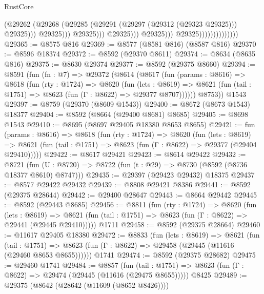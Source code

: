 \begin{lexlean}{RustCore}
\begin{coremodule}
                                                      (@29262
                                                        (@29268
                                                          (@29285
                                                            (@29291
                                                              (@29297 (@29312 (@29323 @29325)))
                                                              @29325)))
                                                        @29325)))
                                                  @29325)))
                                            @29325)))
                                      @29325)))
                                @29325))))))))))))))
@29365 := @8575 @816
@29369 := @8577 (@8581 @816) (@8587 @816)
@29370 := @8596 @18374
@29372 := @8592 (@29370 @8611)
@29374 := @8634 (@8635 @816)
@29375 := @8630 @29374
@29377 := @8592 (@29375 @8660)
@29394 := @8591
    (fun (fn : @7) =>
    @29372
      (@8614
        (@8617
          (fun (params : @8616) =>
          @8618
            (fun (rty : @1724) =>
            @8620
              (fun (lets : @8619) =>
              @8621 (fun (tail : @1751) => @8623 (fun (Γ : @8622) => @29377 @8707))))))
        @8753))
    @1543
@29397 := @8759 (@29370 (@8609 @1543))
@29400 := @8672 (@8673 @1543) @18377
@29404 := @8592 (@8664 (@29400 @8681) @8685)
@29405 := @8698 @1543
@29410 := @8695 (@8697 @29405 @18380 @8653 @8655)
@29421 := fun (params : @8616) =>
  @8618
    (fun (rty : @1724) =>
    @8620
      (fun (lets : @8619) =>
      @8621 (fun (tail : @1751) => @8623 (fun (Γ : @8622) => @29377 (@29404 @29410)))))
@29422 := @8617 @29421
@29423 := @8614 @29422
@29432 := @8721
    (fun (U : @8720) => @8722 (fun (t : @29) => @8730 (@8592 (@8736 @18377 @8610) @8747)))
@29435 := @29397 (@29423 @29432) @18375
@29437 := @8577 @29422 @29432
@29439 := @8808 @29421 @8386
@29441 := @8592 (@29375 @28644)
@29442 := @29400 @28647
@29443 := @8664 @29442
@29445 := @8592 (@29443 @8685)
@29456 := @8811
    (fun (rty : @1724) =>
    @8620
      (fun (lets : @8619) =>
      @8621 (fun (tail : @1751) => @8623 (fun (Γ : @8622) => @29441 (@29445 @29410)))))
    @1711
@29458 := @8592 (@29375 @28664)
@29460 := @11617 @29405 @18380
@29472 := @8833
    (fun (lets : @8619) =>
    @8621
      (fun (tail : @1751) =>
      @8623 (fun (Γ : @8622) => @29458 (@29445 (@11616 (@29460 @8653 @8655))))))
    @1741
@29474 := @8592 (@29375 @28682)
@29475 := @29460 @1741
@29484 := @8857
    (fun (tail : @1751) => @8623 (fun (Γ : @8622) => @29474 (@29445 (@11616 (@29475 @8655)))))
    @8425
@29489 := @29375 (@8642 (@28642 (@11609 (@8652 @8426))))

\end{coremodule}
\end{lexlean}
